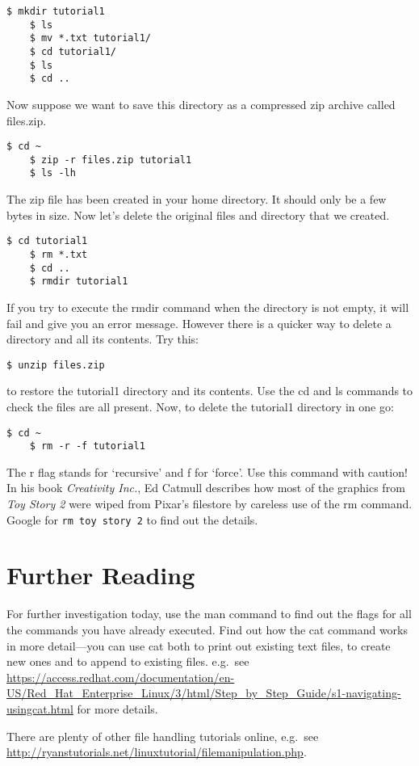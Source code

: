 \documentclass{article}
\begin{document}
\begin{lstlisting}[style=BashInputStyle]
    $ mkdir tutorial1
    $ ls
    $ mv *.txt tutorial1/
    $ cd tutorial1/
    $ ls
    $ cd ..
\end{lstlisting}

Now suppose we want to save this directory as a compressed zip archive called files.zip.

\begin{lstlisting}[style=BashInputStyle]
    $ cd ~
    $ zip -r files.zip tutorial1 
    $ ls -lh    
\end{lstlisting}

The zip file has been created in your home directory. It should only be a few bytes in size. Now let's delete the original files and directory that we created.

\begin{lstlisting}[style=BashInputStyle]
    $ cd tutorial1
    $ rm *.txt
    $ cd ..
    $ rmdir tutorial1  
\end{lstlisting}


If you try to execute the rmdir command when the directory is not empty, it will fail and give you an error message. However there is a quicker way to delete a directory and all its contents. Try this:

\begin{lstlisting}[style=BashInputStyle]
    $ unzip files.zip
\end{lstlisting}

to restore the tutorial1 directory and its contents. Use the cd and ls commands to check the files are all present. Now, to delete the tutorial1 directory in one go:

\begin{lstlisting}[style=BashInputStyle]
    $ cd ~
    $ rm -r -f tutorial1
\end{lstlisting}

The r flag stands for `recursive' and f for `force'. Use this command with caution! In his book \textit{Creativity Inc.}, Ed Catmull describes how most of the graphics from \textit{Toy Story 2} were wiped from Pixar's filestore by careless use of the rm command. Google for \texttt{rm toy story 2} to find out the details.


\section*{Further Reading}

For further investigation today, use the man command to find out 
the flags for all the commands you have already executed.
Find out how the cat command works in more detail---you can use cat both to print out existing text files, to create new ones and to append to existing files. e.g.\ see \url{https://access.redhat.com/documentation/en-US/Red_Hat_Enterprise_Linux/3/html/Step_by_Step_Guide/s1-navigating-usingcat.html} for more details.

There are plenty of other file handling tutorials online, e.g.\ see \url{http://ryanstutorials.net/linuxtutorial/filemanipulation.php}.
\end{document}
